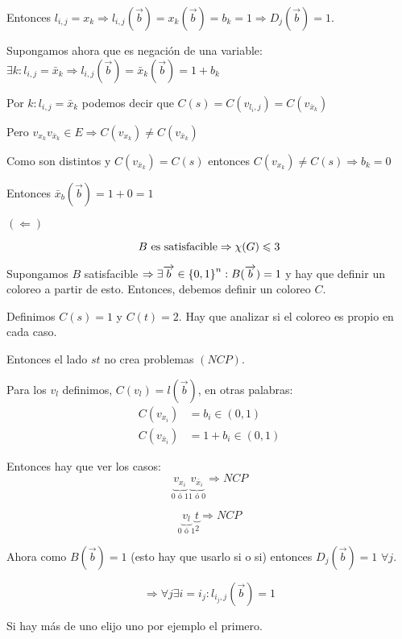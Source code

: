 \documentclass[12pt,a4paper]{article}
\begin{document}
Entonces $l_{i,j} = x_{k} \Rightarrow l_{i,j}(\overrightarrow{b}) = x_{k}(\overrightarrow{b}) = b_{k} = 1 \Rightarrow D_{j}(\overrightarrow{b}) = 1$.
\medskip

Supongamos ahora que es negación de una variable:
$\exists k: l_{i,j} = \bar{x}_{k} \Rightarrow l_{i,j}(\overrightarrow{b}) = \bar{x}_{k}(\overrightarrow{b}) = 1 + b_{k}$

Por $k: l_{i,j} = \bar{x}_{k}$ podemos decir que $C(s) = C(v_{l_{i},j}) = C(v_{\bar{x}_{k}})$
\medskip

Pero $v_{x_{k}}v_{\bar{x}_{k}} \in E \Rightarrow C(v_{x_{k}}) \neq C(v_{\bar{x}_{k}})$
\medskip

Como son distintos y $C(v_{\bar{x}_{k}}) = C(s)$ entonces $C(v_{x_{k}}) \neq C(s) \Rightarrow b_{k} = 0$
\medskip

Entonces $\bar{x}_{b}(\overrightarrow{b}) = 1+0 = 1$

$(\Leftarrow)$ 

$$B \text{ es satisfacible} \Rightarrow \chi(G) \leqslant 3$$

Supongamos $B$ satisfacible $\Rightarrow \exists \overrightarrow{b} \in \left\lbrace 0,1 \right\rbrace^{n} : B(\overrightarrow{b}) = 1$ 
y hay que definir un coloreo a partir de esto. Entonces, debemos definir un coloreo 
$C$.
\medskip

Definimos $C(s) = 1$ y $C(t) =2$. Hay que analizar si el coloreo es propio en cada caso.
\medskip

Entonces el lado $st$ no crea problemas $(NCP)$.
\medskip

Para los $v_{l}$ definimos, $C(v_{l}) = l(\overrightarrow{b})$, en otras palabras:
\begin{align*}
    C(v_{x_{i}}) &= b_{i} \in (0,1) \\
    C(v_{\bar{x}_{i}}) &= 1 + b_{i} \in (0,1)
\end{align*}

Entonces hay que ver los casos:
$$\underbrace{v_{x_{i}}}_{0\,\,\text{ó}\,\,1} \underbrace{v_{\bar{x}_{i}}}_{1\,\,\text{ó}\,\,0} \Rightarrow NCP $$

$$\underbrace{v_{l}}_{0\,\,\text{ó}\,\,1} \underbrace{t}_{2} \Rightarrow NCP $$

Ahora como $B(\overrightarrow{b}) = 1$ (esto hay que usarlo si o si) entonces 
$D_{j}(\overrightarrow{b}) = 1\,\, \forall j$.
\medskip

$$\Rightarrow \forall j \exists i = i_{j} : l_{i_{j},j}(\overrightarrow{b}) = 1$$

Si hay más de uno elijo uno por ejemplo el primero.
\medskip
\end{document}
